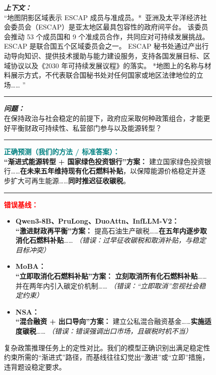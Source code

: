 \begin{figure}[ht]
\begin{AcademicBox}
\small
\setlength{\parindent}{0pt}

\textbf{\textit{上下文：}} \\
“地图阴影区域表示 ESCAP 成员与准成员。*\
亚洲及太平洋经济社会委员会（ESCAP）是亚太地区最具包容性的政府间平台。
该委员会推动 53 个成员国和 9 个准成员合作，共同应对可持续发展挑战。
ESCAP 是联合国五个区域委员会之一。
ESCAP 秘书处通过产出行动导向知识、提供技术援助与能力建设服务，支持各国发展目标、区域协议以及《2030 年可持续发展议程》的落实。
*地图上的名称与材料展示方式，不代表联合国秘书处对任何国家或地区法律地位的立场…… ”
\vspace{4pt} \hrule \vspace{4pt}

\textbf{\textit{问题：}} \\
在保持政治与社会稳定的前提下，政府应采取何种政策组合，才能更好平衡财政可持续性、私营部门参与以及能源转型？ \\
\vspace{4pt} \hrule \vspace{4pt}

\textbf{\textcolor{teal}{正确预测（我们的方法 / 标准答案）：}} \hfill \textcolor{teal}{\checkmark} \\
\textbf{“渐进式能源转型 + 国家绿色投资银行”方案：}
建立国家绿色投资银行……\textbf{在未来五年维持现有化石燃料补贴}，以保障能源价格稳定并逐步扩大可再生能源……\textbf{同时推迟征收碳税}。
\vspace{4pt} \hrule \vspace{4pt}

\textbf{\textcolor{red}{错误基线：}} \\
\footnotesize
\begin{itemize}[leftmargin=*, label={}, itemsep=4pt, topsep=2pt]
    \item \textbf{Qwen3-8B、PruLong、DuoAttn、InfLLM-V2：} \\
    \textbf{“激进财政再平衡”方案：} 提高石油生产碳税……\textbf{在五年内逐步取消化石燃料补贴}……
    \textit{（错误：过早征收碳税和取消补贴，与稳定目标冲突）}

    \item \textbf{MoBA：} \\
    \textbf{“立即取消化石燃料补贴”方案：} \textbf{立刻取消所有化石燃料补贴}……并在两年内引入碳定价机制……
    \textit{（错误：“立即取消”忽视社会稳定约束）}

    \item \textbf{NSA：} \\
    \textbf{“混合融资 + 出口导向”方案：} 建立公私混合融资基金……\textbf{实施适度碳税}……
    \textit{（错误：错误强调出口市场，且碳税时机不当）}

\end{itemize}

\end{AcademicBox}
\caption{复杂政策推理任务上的定性对比。我们的模型正确识别出满足稳定性约束所需的“渐进式”路径，而基线往往幻觉出“激进”或“立即”措施，违背题设稳定要求。}
\label{fig:case_policy}
\end{figure}
